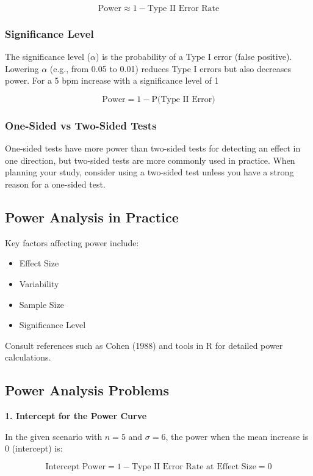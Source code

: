 \documentclass{article}
\begin{document}
\[
\text{Power} \approx 1 - \text{Type II Error Rate}
\]

\subsubsection*{Significance Level}

The significance level (\(\alpha\)) is the probability of a Type I error (false positive). Lowering \(\alpha\) (e.g., from 0.05 to 0.01) reduces Type I errors but also decreases power. For a 5 bpm increase with a significance level of 1%

\[
\text{Power} = 1 - \text{P(Type II Error)}
\]

\subsubsection*{One-Sided vs Two-Sided Tests}

One-sided tests have more power than two-sided tests for detecting an effect in one direction, but two-sided tests are more commonly used in practice. When planning your study, consider using a two-sided test unless you have a strong reason for a one-sided test.

\subsection*{Power Analysis in Practice}

Key factors affecting power include:
\begin{itemize}
    \item Effect Size
    \item Variability
    \item Sample Size
    \item Significance Level
\end{itemize}

Consult references such as Cohen (1988) and tools in R for detailed power calculations.

\subsection*{Power Analysis Problems}

\textbf{1. Intercept for the Power Curve}

In the given scenario with \(n = 5\) and \(\sigma = 6\), the power when the mean increase is 0 (intercept) is:

\[
\text{Intercept Power} = 1 - \text{Type II Error Rate} \text{ at } \text{Effect Size} = 0
\]
\end{document}
